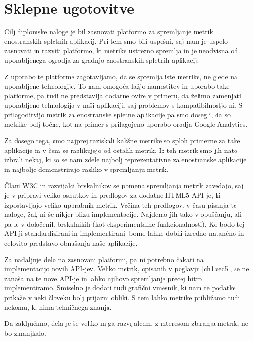 \documentclass[a4paper, 12pt]{book}
\begin{document}
\chapter{Sklepne ugotovitve}
\label{ch4}

Cilj diplomske naloge je bil zasnovati platformo za spremljanje metrik enostranskih spletnih aplikacij. Pri tem smo bili uspešni, saj nam je uspelo zasnovati in razviti platformo, ki metrike ustrezno spremlja in je neodvisna od uporabljenega ogrodja za gradnjo enostranskih spletnih aplikacij.

Z uporabo te platforme zagotavljamo, da se spremlja iste metrike, ne glede na uporabljene tehnologije. To nam omogoča lažjo namestitev in uporabo take platforme, pa tudi ne predstavlja dodatne ovire v primeru, da želimo zamenjati uporabljeno tehnologijo v naši aplikaciji, saj problemov s kompatibilnostjo ni. S prilagoditvijo metrik za enostranske spletne aplikacije pa smo dosegli, da so metrike bolj točne, kot na primer s prilagojeno uporabo orodja Google Analytics.

Za dosego tega, smo najprej raziskali kakšne metrike so sploh primerne za take aplikacije in v čem se razlikujejo od ostalih metrik. Iz teh metrik smo jih nato izbrali nekaj, ki so se nam zdele najbolj reprezentativne za enostranske aplikacije in najbolje demonstrirajo razliko v spremljanju metrik.

Člani W3C in razvijalci brskalnikov se pomena spremljanja metrik zavedajo, saj je v pripravi veliko osnutkov in predlogov za dodatne HTML5 API-je, ki izpostavljajo veliko uporabnih metrik. Večina teh predlogov, v času pisanja te naloge, žal, ni še nikjer blizu implementacije. Najdemo jih tako v opuščanju, ali pa le v določenih brskalnikih (kot eksperimentalne funkcionalnosti). Ko bodo tej API-ji standardizirani in implementirani, bomo lahko dobili izredno natančno in celovito predstavo obnašanja naše aplikacije.

Za nadaljnje delo na zasnovani platformi, pa ni potrebno čakati na implementacijo novih API-jev. Veliko metrik, opisanih v poglavju \ref{ch1:sec5}, se ne zanaša na te nove API-je in lahko njihovo spremljanje precej hitro implementiramo. Smiselno je dodati tudi grafični vmesnik, ki nam te podatke prikaže v neki človeku bolj prijazni obliki. S tem lahko metrike približamo tudi nekomu, ki nima tehničnega znanja.

Da zaključimo, dela je še veliko in ga razvijalcem, z interesom zbiranja metrik, ne bo zmanjkalo.

\newpage %
\ \\
\clearpage
{}


\end{document}
